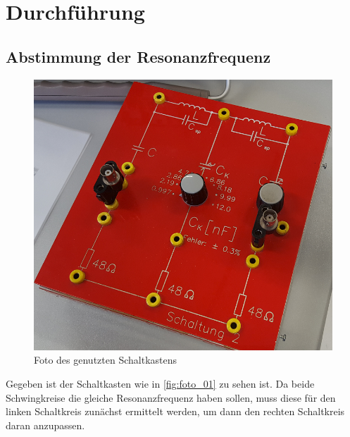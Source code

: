 \section{Durchführung}
\label{sec:Durchführung}


\subsection{Abstimmung der Resonanzfrequenz}
\label{sec:resonanz}

\begin{figure}
    \centering
    \includegraphics[width=\textwidth/2]{images/foto_01.png}
    \caption{Foto des genutzten Schaltkastens}
    \label{fig:foto_01}
\end{figure}
Gegeben ist der Schaltkasten wie in \autoref{fig:foto_01} zu sehen ist.
Da beide Schwingkreise die gleiche Resonanzfrequenz haben sollen, muss diese für den linken Schaltkreis zunächst ermittelt werden, um dann den rechten Schaltkreis daran anzupassen.

